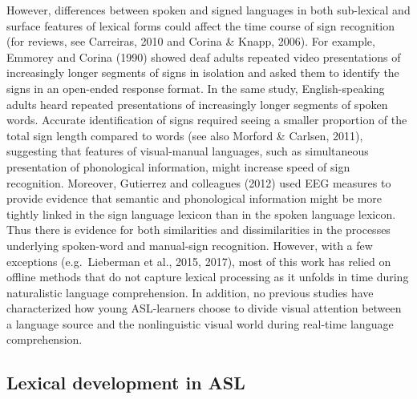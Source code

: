 \documentclass[oneside]{report}
\begin{document}
However, differences between spoken and signed languages in both
sub-lexical and surface features of lexical forms could affect the time
course of sign recognition (for reviews, see Carreiras, 2010 and Corina
\& Knapp, 2006). For example, Emmorey and Corina (1990) showed deaf
adults repeated video presentations of increasingly longer segments of
signs in isolation and asked them to identify the signs in an open-ended
response format. In the same study, English-speaking adults heard
repeated presentations of increasingly longer segments of spoken words.
Accurate identification of signs required seeing a smaller proportion of
the total sign length compared to words (see also Morford \& Carlsen,
2011), suggesting that features of visual-manual languages, such as
simultaneous presentation of phonological information, might increase
speed of sign recognition. Moreover, Gutierrez and colleagues (2012)
used EEG measures to provide evidence that semantic and phonological
information might be more tightly linked in the sign language lexicon
than in the spoken language lexicon. Thus there is evidence for both
similarities and dissimilarities in the processes underlying spoken-word
and manual-sign recognition. However, with a few exceptions
(e.g.~Lieberman et al., 2015, 2017), most of this work has relied on
offline methods that do not capture lexical processing as it unfolds in
time during naturalistic language comprehension. In addition, no
previous studies have characterized how young ASL-learners choose to
divide visual attention between a language source and the nonlinguistic
visual world during real-time language comprehension.

\hypertarget{lexical-development-in-asl}{%
\subsection{Lexical development in
ASL}\label{lexical-development-in-asl}}
\end{document}
